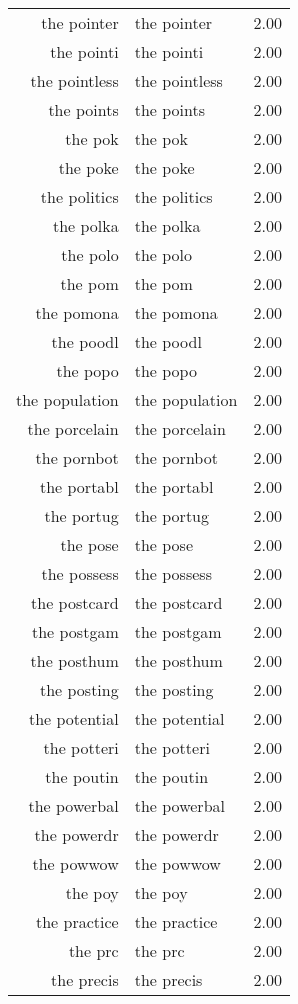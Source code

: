 \begin{table}[ht]
\begin{tabular}{rlr}
  the pointer & the pointer & 2.00 \\ 
  the pointi & the pointi & 2.00 \\ 
  the pointless & the pointless & 2.00 \\ 
  the points & the points & 2.00 \\ 
  the pok & the pok & 2.00 \\ 
  the poke & the poke & 2.00 \\ 
  the politics & the politics & 2.00 \\ 
  the polka & the polka & 2.00 \\ 
  the polo & the polo & 2.00 \\ 
  the pom & the pom & 2.00 \\ 
  the pomona & the pomona & 2.00 \\ 
  the poodl & the poodl & 2.00 \\ 
  the popo & the popo & 2.00 \\ 
  the population & the population & 2.00 \\ 
  the porcelain & the porcelain & 2.00 \\ 
  the pornbot & the pornbot & 2.00 \\ 
  the portabl & the portabl & 2.00 \\ 
  the portug & the portug & 2.00 \\ 
  the pose & the pose & 2.00 \\ 
  the possess & the possess & 2.00 \\ 
  the postcard & the postcard & 2.00 \\ 
  the postgam & the postgam & 2.00 \\ 
  the posthum & the posthum & 2.00 \\ 
  the posting & the posting & 2.00 \\ 
  the potential & the potential & 2.00 \\ 
  the potteri & the potteri & 2.00 \\ 
  the poutin & the poutin & 2.00 \\ 
  the powerbal & the powerbal & 2.00 \\ 
  the powerdr & the powerdr & 2.00 \\ 
  the powwow & the powwow & 2.00 \\ 
  the poy & the poy & 2.00 \\ 
  the practice & the practice & 2.00 \\ 
  the prc & the prc & 2.00 \\ 
  the precis & the precis & 2.00 \\ 

\end{tabular}
\end{table}
